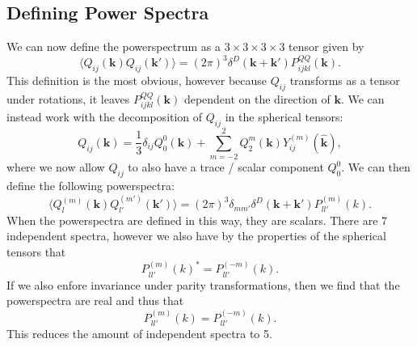 \documentclass[11pt]{book}
\begin{document}
\subsection{Defining Power Spectra}
We can now define the powerspectrum as a $3 \times 3 \times 3 \times 3$ tensor given by
\begin{equation}
    \langle Q_{ij}(\mathbf k)Q_{ij}(\mathbf k') \rangle = (2 \pi)^3\delta^D(\mathbf k + \mathbf k')P_{ijkl}^{QQ}(\mathbf k).
\end{equation}
This definition is the most obvious, however because $Q_{ij}$ transforms as a tensor under rotations, it leaves $P_{ijkl}^{QQ}(\mathbf k)$ dependent on the direction of $\mathbf k$. We can instead work with the decomposition of $Q_{ij}$ in the spherical tensors:
\begin{equation}
    Q_{ij}(\mathbf k) = \frac{1}{3}\delta_{ij}Q_0^0(\mathbf k) + \sum_{m=-2}^2Q_2^m(\mathbf k)Y_{ij}^{(m)}(\hat{\mathbf k}),
\end{equation}
where we now allow $Q_{ij}$ to also have a trace / scalar component $Q_0^0$. %
We can then define the following powerspectra:
\begin{equation}
    \langle Q_l^{(m)}(\mathbf k)Q_{l'}^{(m')}(\mathbf k')\rangle = (2\pi)^3\delta_{mm'}\delta^D(\mathbf k + \mathbf k')P^{(m)}_{ll'}(k).
\end{equation}
When the powerspectra are defined in this way, they are scalars. There are 7 independent spectra, however we also have by the properties of the spherical tensors that
\begin{equation}
    P_{ll'}^{(m)}(k)^*=P_{ll'}^{(-m)}(k).
\end{equation}
If we also enfore invariance under parity transformations, then we find that the powerspectra are real and thus that
\begin{equation}
    P^{(m)}_{ll'}(k)=P^{(-m)}_{ll'}(k).
\end{equation}
This reduces the amount of independent spectra to 5. %
\end{document}
